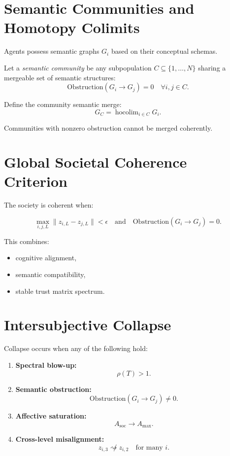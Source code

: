 \documentclass[12pt,oneside]{book}
\theoremstyle{plain}
\theoremstyle{definition}
\begin{document}
\section{Semantic Communities and Homotopy Colimits}

Agents possess semantic graphs $G_i$ based on their conceptual schemas.

Let a \emph{semantic community} be any subpopulation $C\subseteq \{1,\dots,N\}$
sharing a mergeable set of semantic structures:
\[
\mathrm{Obstruction}(G_i \to G_j) = 0 \quad \forall i,j\in C.
\]

Define the community semantic merge:
\[
G_C = \operatorname{hocolim}_{i \in C} G_i.
\]

Communities with nonzero obstruction cannot be merged coherently.

\section{Global Societal Coherence Criterion}

The society is coherent when:

\[
\max_{i,j,L} \| z_{i,L} - z_{j,L} \| < \epsilon
\quad\text{and}\quad
\mathrm{Obstruction}(G_i \to G_j) = 0.
\]

This combines:

\begin{itemize}
  \item cognitive alignment,
  \item semantic compatibility,
  \item stable trust matrix spectrum.
\end{itemize}

\section{Intersubjective Collapse}

Collapse occurs when any of the following hold:

\begin{enumerate}
  \item \textbf{Spectral blow-up:}
        \[
        \rho(T) > 1.
        \]
  \item \textbf{Semantic obstruction:}
        \[
        \mathrm{Obstruction}(G_i \to G_j) \neq 0.
        \]
  \item \textbf{Affective saturation:}
        \[
        A_{\mathrm{soc}} \to A_{\max}.
        \]
  \item \textbf{Cross-level misalignment:}
        \[
        z_{i,3} \not\rightsquigarrow z_{i,2}
        \quad\text{for many } i.
        \]
\end{enumerate}
\end{document}
